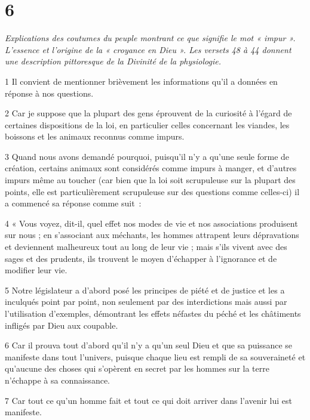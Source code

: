 \chapter{6}

\par \textit{Explications des coutumes du peuple montrant ce que signifie le mot « impur ». L’essence et l’origine de la « croyance en Dieu ». Les versets 48 à 44 donnent une description pittoresque de la Divinité de la physiologie.}

\par 1 Il convient de mentionner brièvement les informations qu'il a données en réponse à nos questions.

\par 2 Car je suppose que la plupart des gens éprouvent de la curiosité à l'égard de certaines dispositions de la loi, en particulier celles concernant les viandes, les boissons et les animaux reconnus comme impurs.

\par 3 Quand nous avons demandé pourquoi, puisqu'il n'y a qu'une seule forme de création, certains animaux sont considérés comme impurs à manger, et d'autres impurs même au toucher (car bien que la loi soit scrupuleuse sur la plupart des points, elle est particulièrement scrupuleuse sur des questions comme celles-ci) il a commencé sa réponse comme suit :

\par 4 « Vous voyez, dit-il, quel effet nos modes de vie et nos associations produisent sur nous ; en s'associant aux méchants, les hommes attrapent leurs dépravations et deviennent malheureux tout au long de leur vie ; mais s'ils vivent avec des sages et des prudents, ils trouvent le moyen d'échapper à l'ignorance et de modifier leur vie.

\par 5 Notre législateur a d'abord posé les principes de piété et de justice et les a inculqués point par point, non seulement par des interdictions mais aussi par l'utilisation d'exemples, démontrant les effets néfastes du péché et les châtiments infligés par Dieu aux coupable.

\par 6 Car il prouva tout d'abord qu'il n'y a qu'un seul Dieu et que sa puissance se manifeste dans tout l'univers, puisque chaque lieu est rempli de sa souveraineté et qu'aucune des choses qui s'opèrent en secret par les hommes sur la terre n'échappe à sa connaissance.

\par 7 Car tout ce qu'un homme fait et tout ce qui doit arriver dans l'avenir lui est manifeste.

